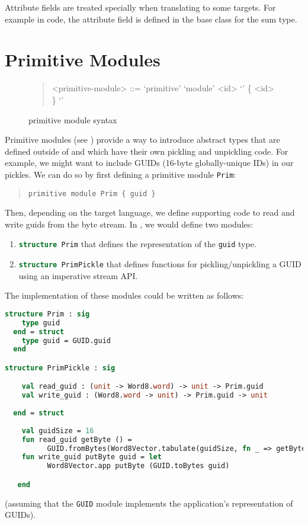 Attribute fields are treated specially when translating to some targets.
For example in \Cplusplus{} code, the attribute field is defined in the base class for the sum type.

\section{Primitive Modules}
\label{sec:primitive-syntax}

\begin{figure}[t]
  \begin{quote}
    \begin{grammar}
      <primitive-module> ::= `primitive' `module' <id> `{' \{ <id> \} `}'
    \end{grammar}%
  \end{quote}%
  \caption{\asdl{} primitive module syntax}
  \label{fig:prim-module-syntax}
\end{figure}%

Primitive modules (see ) provide a way to introduce abstract
types that are defined outside
of \asdl{} and which have their own pickling and unpickling code.
For example, we might want to include GUIDs (16-byte globally-unique IDs) in our pickles.
We can do so by first defining a primitive module \lstinline!Prim!:
%
\begin{quote}\begin{lstlisting}[language=ASDL]
primitive module Prim { guid }
\end{lstlisting}\end{quote}%
%
Then, depending on the target language, we define
supporting code to read and write guids from the byte stream.
In \sml{}, we would define two modules:
\begin{enumerate}
  \item \lstinline[language=SML]!structure Prim! that defines the representation of the
    \lstinline[language=SML]!guid! type.
  \item
    \lstinline[language=SML]!structure PrimPickle! that defines functions
    for pickling/unpickling a GUID using an imperative stream API.
\end{enumerate}%
The \sml{} implementation of these modules could be written as follows:
\begin{code}\begin{lstlisting}[language=SML]
structure Prim : sig
    type guid
  end = struct
    type guid = GUID.guid
  end

structure PrimPickle : sig

    val read_guid : (unit -> Word8.word) -> unit -> Prim.guid
    val write_guid : (Word8.word -> unit) -> Prim.guid -> unit
    
  end = struct
  
    val guidSize = 16
    fun read_guid getByte () =
          GUID.fromBytes(Word8Vector.tabulate(guidSize, fn _ => getByte()))
    fun write_guid putByte guid = let
          Word8Vector.app putByte (GUID.toBytes guid)

   end
\end{lstlisting}\end{code}%
(assuming that the \lstinline!GUID! module implements the application's representation
of GUIDs).


